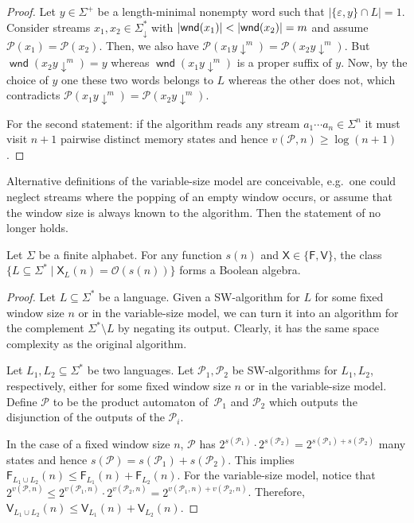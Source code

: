 \documentclass{article}\usepackage[a4paper,margin=20mm]{geometry}
\renewcommand{\O}{\mathcal{O}}
\renewcommand{\P}{\mathcal{P}}
\newcommand{\F}{\mathsf{F}}
\newcommand{\V}{\mathsf{V}}
\newcommand{\X}{\mathsf{X}}
\DeclareMathOperator{\wnd}{\mathsf{wnd}}
\newcommand{\eps}{\varepsilon}
\DeclarePairedDelimiter{\abs}{\lvert}{\rvert}
\renewcommand{\geq}{\geqslant}
\renewcommand{\leq}{\leqslant}
\renewcommand{\ge}{\geq}
\renewcommand{\le}{\leq}
\begin{document}
\begin{proof}
	Let $y \in \Sigma^+$ be a length-minimal nonempty word such that $|\{\eps,y\} \cap L| = 1$.
	Consider streams $x_1, x_2 \in \Sigma_\downarrow^*$ with $\abs{\wnd(x_1)} < \abs{\wnd(x_2)} = m$ and assume $\P(x_1) = \P(x_2)$.
	Then, we also have $\P(x_1 y \!\! \downarrow^m) = \P(x_2 y\!\!\downarrow^m)$.
	But $\wnd(x_2 y \!\! \downarrow^m) = y$ whereas $\wnd(x_1 y \!\!  \downarrow^m)$ is a proper suffix of $y$.
	Now, by the choice of $y$ one these two words belongs to $L$ whereas the other does not, which contradicts
	$\P(x_1 y \!\!  \downarrow^m) = \P(x_2 y \!\! \downarrow^m)$.
	
	For the second statement: if the algorithm reads any stream $a_1 \cdots a_n \in \Sigma^n$
	it must visit $n+1$ pairwise distinct
	memory states and hence $v(\P,n) \ge \log (n+1)$.
\end{proof}

Alternative definitions of the variable-size model are conceivable,
e.g.~one could neglect streams where the popping of an empty window occurs,
or assume that the window size is always known to the algorithm. Then the statement of 
 no longer holds.

\begin{lemma}
	\label{lem:boolean}
	Let $\Sigma$ be a finite alphabet.
	For any function $s(n)$ and $\X \in \{\F,\V\}$, the class
	$\{ L \subseteq \Sigma^* \mid \X_L(n) = \O(s(n)) \}$
	forms a Boolean algebra.
\end{lemma}

\begin{proof}
	Let $L \subseteq \Sigma^*$ be a language.
	Given a SW-algorithm for $L$ for some fixed window size $n$
	or in the variable-size model,
	we can turn it into an algorithm for the complement $\Sigma^* \setminus L$
	by negating its output.
	Clearly, it has the same space complexity as the original algorithm.
	
	Let $L_1,L_2 \subseteq \Sigma^*$ be two languages.
	Let $\P_1,\P_2$ be SW-algorithms for $L_1,L_2$, respectively, either
	for some fixed window size $n$ or in the variable-size model.
	Define $\P$ to be the product automaton of~$\P_1$ and $\P_2$
	which outputs the disjunction of the outputs of the $\P_i$.
	
	In the case of a fixed window size $n$, $\P$ has 
	$2^{s(\P_1)} \cdot 2^{s(\P_2)} = 2^{s(\P_1)+s(\P_2)}$ many states
	and hence $s(\P) = s(\P_1) + s(\P_2)$.
	This implies $\F_{L_1 \cup L_2}(n) \le \F_{L_1}(n) + \F_{L_2}(n)$.
	For the variable-size model, notice that
	$2^{v(\P,n)} \le 2^{v(\P_1,n)} \cdot 2^{v(\P_2,n)} = 2^{v(\P_1,n) + v(\P_2,n)}$.
	Therefore, $\V_{L_1 \cup L_2}(n) \le \V_{L_1}(n) + \V_{L_2}(n)$.
\end{proof}
\end{document}
